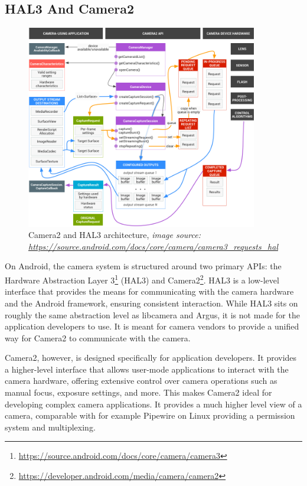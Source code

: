\subsection{HAL3 And Camera2}
\begin{figure}
    \begin{center}
        \includegraphics[width=0.90\textwidth]{figures/camera2.png}
    \end{center}
    \caption{Camera2 and HAL3 architecture,
    \textit{image source: \url{https://source.android.com/docs/core/camera/camera3\_requests\_hal}}}\label{fig:camera2}
\end{figure}


On Android, the camera system is structured around two primary APIs: the
Hardware Abstraction Layer 3\footnote{\url{https://source.android.com/docs/core/camera/camera3}} (HAL3)
and Camera2\footnote{\url{https://developer.android.com/media/camera/camera2}}. HAL3
is a low-level interface that provides the means for communicating with the
camera hardware and the Android framework, ensuring consistent interaction.
While HAL3 sits on roughly the same abstraction level as libcamera and Argus,
it is not made for the application developers to use. It is meant for camera
vendors to provide a unified way for Camera2 to communicate with the camera.

Camera2, however, is designed specifically for application developers. It
provides a higher-level interface that allows user-mode applications to
interact with the camera hardware, offering extensive control over camera
operations such as manual focus, exposure settings, and more. This makes
Camera2 ideal for developing complex camera applications. It provides a much
higher level view of a camera, comparable with for example Pipewire on Linux
providing a permission system and multiplexing.

